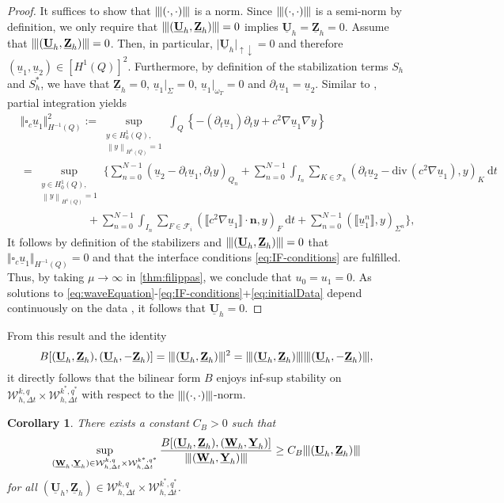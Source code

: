 \documentclass[sn-mathphys-num]{sn-jnl}
\newtheorem{cor}[thm]{Corollary}
\numberwithin{equation}{section}
\newcommand{\jump}[1]{\llbracket#1\rrbracket}
\renewcommand{\div}{\mathrm{div}\,}  %
\newcommand{\wop}{\square_c}
\newcommand{\tnorm}[1]{\vert\hspace{-0.3mm}\Vert#1\Vert\hspace{-0.3mm}\vert}
\providecommand{\norm}[1]{\left\lVert#1\right\rVert}
\providecommand{\norm}[1]{\left\lVert#1\right\rVert}
\newcommand{\dT}{\mathrm{d}t}
\newcommand{\ProdFullyDiscrSpace}[2]{ \mathcal{W}^{ {#1},{#2}}_{h, \Delta t  } }
\newcommand{\Uh}{\underline{\mathbf{U}}_h}
\newcommand{\Yh}{\underline{\mathbf{Y}}_h}
\newcommand{\Zh}{\underline{\mathbf{Z}}_h}
\newcommand{\Wh}{\underline{\mathbf{W}}_h}
\newcommand{\ul}{\underline{u}}
\newcommand{\dt}{\partial_t}
\begin{document}
\begin{proof}
    It suffices to show that $\tnorm{(\cdot,\cdot)}$ is a norm. Since $\tnorm{(\cdot,\cdot)}$ is a semi-norm by definition, we only require that $\tnorm{(\Uh,\Zh)} = 0$ implies $\Uh=\Zh= 0$. Assume that $\tnorm{(\Uh,\Zh)} = 0$. Then, in particular, $\vert \Uh \vert_{\uparrow \downarrow} = 0$ and therefore $(\ul_1,\ul_2) \in [H^1(Q)]^2$. Furthermore, by definition of the stabilization terms $S_h$ and $S_h^{\ast}$, we have that $\Zh = 0$, $\ul_1 \vert_{\Sigma} = 0$, $\ul_1 \vert_{\omega_T} = 0$ and $\dt \ul_1 = \ul_2$. Similar to \cite[Lemma 2]{BP24}, partial integration yields 
    \begin{align*}
	   & \Vert \wop \ul_1 \Vert^2_{H^{-1}(Q)} := \sup_{\substack{  y \in H^1_0(Q), \\ \norm{y}_{H^1(Q) } = 1  }} \int_{Q} \left\{ -(\dt \ul_1) \dt y + c^2 \nabla \ul_1 \nabla y \right\}  \\
        &= \sup_{\substack{  y \in H^1_0(Q), \\ \norm{y}_{H^1(Q) } = 1  }} \Big\{ \sum_{n = 0}^{N-1} (\ul_2 - \dt \ul_1, \dt y)_{Q_n} 
        + \sum_{n = 0}^{N-1} \int_{I_n} \sum_{K \in \mathcal{T}_h} (\dt \ul_2 - \div(c^2 \nabla \ul_1),y)_{K} \ \dT \\
	    & \hspace{6em} + \sum_{n = 0}^{N-1} \int_{I_n} \sum_{F \in \mathcal{F}_i} (\jump{c^2 \nabla \ul_1} \cdot \mathbf{n}, y)_F \ \dT + \sum_{n = 0}^{N-1} (\jump{\ul_1^n},y)_{\Sigma^n} \Big\},
    \end{align*}
It follows by definition of the stabilizers and $\tnorm{(\Uh,\Zh)} = 0$ that $\Vert \wop \ul_1 \Vert_{H^{-1}(Q)} = 0$ and that the interface conditions \eqref{eq:IF-conditions} are fulfilled. Thus, by taking $\mu \rightarrow \infty$ in \cref{thm:filippas}, we conclude that $u_0 = u_1 = 0$. As solutions to \eqref{eq:waveEquation}-\eqref{eq:IF-conditions}+\eqref{eq:initialData} depend continuously on the data \cite{StolkPhD}, it follows that $\Uh = 0$. 
\end{proof}

 From this result and the identity
\[
B[(\Uh,\Zh),(\Uh,-\Zh)] = \tnorm{(\Uh,\Zh)}^2 = \tnorm{(\Uh,\Zh)}\tnorm{(\Uh,-\Zh)},
\]
it directly follows that the bilinear form $B$ enjoys inf-sup stability on $\ProdFullyDiscrSpace{k}{q} \times \ProdFullyDiscrSpace{k^\ast}{q^\ast}$ with respect to the $\tnorm{(\cdot,\cdot)}$-norm. 

\begin{cor}\label{cor:infsup}
    There exists a constant $C_B>0$ such that 
    \begin{equation}
        \sup_{(\Wh,\Yh) \in \ProdFullyDiscrSpace{k}{q} \times \ProdFullyDiscrSpace{k^\ast}{q^\ast}} \frac{B[(\Uh,\Zh),(\Wh,\Yh)]}{\tnorm{(\Wh,\Yh)}} \ge C_B \tnorm{(\Uh,\Zh)}
    \end{equation}
    for all $(\Uh,\Zh) \in \ProdFullyDiscrSpace{k}{q} \times \ProdFullyDiscrSpace{k^\ast}{q^\ast}$.
\end{cor}
\end{document}
